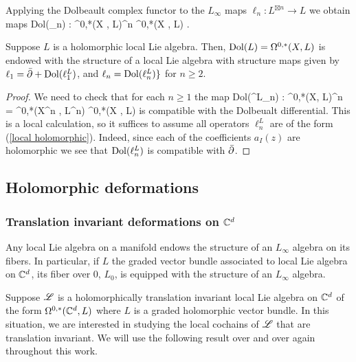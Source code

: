 \documentclass[10pt]{amsart}
\begin{document}
Applying the Dolbeault complex functor to the $L_\infty$ maps $\ell_n : L^{\boxtimes n} \to L$ we obtain maps
\ben
{\rm Dol}(\ell_n) : \Omega^{0,*}(X , L)^{\tensor n} \to \Omega^{0,*}(X , L) . 
\een 

\begin{lem} Suppose $L$ is a holomorphic local Lie algebra. 
Then, ${\rm Dol}(L) = \Omega^{0,*}(X , L)$ is endowed with the structure of a local Lie algebra with structure maps given by $\ell_1 = \Bar{\partial} + {\rm Dol}(\ell^L_1)$, and $\ell_n = {\rm Dol}(\ell^L_n)\}$ for $n \geq 2$. 
\end{lem}
\begin{proof}
We need to check that for each $n \geq 1$ the map
\ben 
{\rm Dol}(\ell^L_n) : \Omega^{0,*}(X, L)^{\tensor n} = \Omega^{0,*}(X^{\times n} , L^{\boxtimes n}) \to \Omega^{0,*}(X , L)
\een
is compatible with the Dolbeualt differential. 
This is a local calculation, so it suffices to assume all operators $\ell_n^L$ are of the form (\ref{local holomorphic}). 
Indeed, since each of the coefficients $a_I(z)$ are holomorphic we see that ${\rm Dol}(\ell_n^L)$ is compatible with $\Bar{\partial}$. 
\end{proof}

\subsection{Holomorphic deformations}

\subsubsection{Translation invariant deformations on $\mathbb C^d$}

Any local Lie algebra on a manifold endows the structure of an $L_\infty$ algebra on its fibers. 
In particular, if $L$ the graded vector bundle associated to local Lie algebra on $\mathbb C^d$, its fiber over $0$, $L_0$, is equipped with the structure of an $L_\infty$ algebra. 

Suppose $\mathscr L$ is a holomorphically translation invariant local Lie algebra on $\mathbb C^d$ of the form $\Omega^{0,*}(\mathbb C^d, L)$ where $L$ is a graded holomorphic vector bundle.
In this situation, we are interested in studying the local cochains of $\mathscr L$ that are translation invariant.
We will use the following result over and over again throughout this work.

\end{document}
